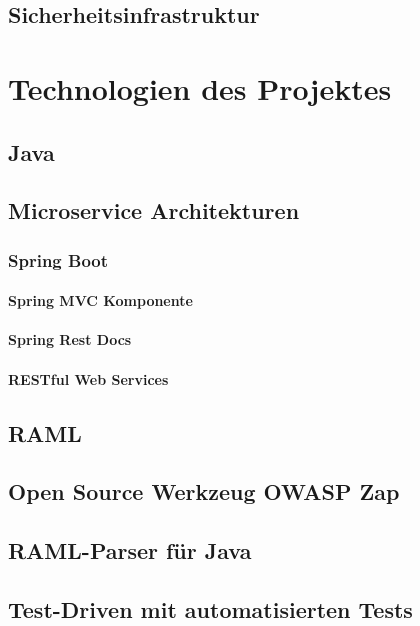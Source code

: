 \subsection{Sicherheitsinfrastruktur}

\section{Technologien des Projektes}

\subsection{Java}

\subsection{Microservice Architekturen}

\subsubsection{Spring Boot}

\paragraph{Spring MVC Komponente}

\paragraph{Spring Rest Docs}

\paragraph{RESTful Web Services}

\subsection{RAML}

\subsection{Open Source Werkzeug OWASP Zap}

\subsection{RAML-Parser für Java}

\subsection{Test-Driven mit automatisierten Tests}

